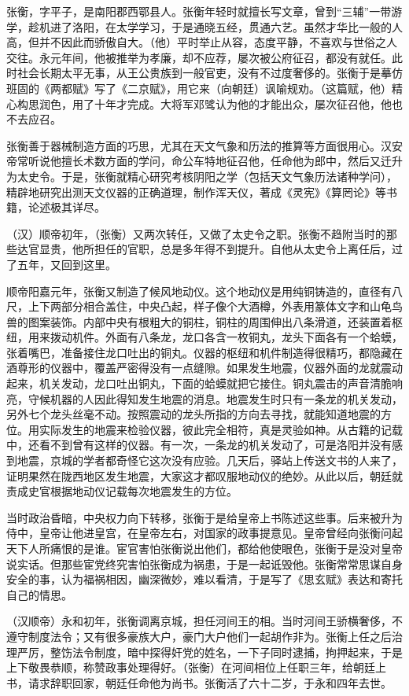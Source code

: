 \documentclass[12pt,UTF-8,openany]{ctexbook}
\begin{document}
\begin{normalsize}
    
    张衡，字平子，是南阳郡西鄂县人。张衡年轻时就擅长写文章，曾到“三辅”一带游学，趁机进了洛阳，在太学学习，于是通晓五经，贯通六艺。虽然才华比一般的人高，但并不因此而骄傲自大。（他）平时举止从容，态度平静，不喜欢与世俗之人交往。永元年间，他被推举为孝廉，却不应荐，屡次被公府征召，都没有就任。此时社会长期太平无事，从王公贵族到一般官吏，没有不过度奢侈的。张衡于是摹仿班固的《两都赋》写了《二京赋》，用它来（向朝廷）讽喻规劝。（这篇赋，他）精心构思润色，用了十年才完成。大将军邓骘认为他的才能出众，屡次征召他，他也不去应召。
    
    张衡善于器械制造方面的巧思，尤其在天文气象和历法的推算等方面很用心。汉安帝常听说他擅长术数方面的学问，命公车特地征召他，任命他为郎中，然后又迁升为太史令。于是，张衡就精心研究考核阴阳之学（包括天文气象历法诸种学问），精辟地研究出测天文仪器的正确道理，制作浑天仪，著成《灵宪》《算罔论》等书籍，论述极其详尽。
    
    （汉）顺帝初年，（张衡）又两次转任，又做了太史令之职。张衡不趋附当时的那些达官显贵，他所担任的官职，总是多年得不到提升。自他从太史令上离任后，过了五年，又回到这里。
    
    顺帝阳嘉元年，张衡又制造了候风地动仪。这个地动仪是用纯铜铸造的，直径有八尺，上下两部分相合盖住，中央凸起，样子像个大酒樽，外表用篆体文字和山龟鸟兽的图案装饰。内部中央有根粗大的铜柱，铜柱的周围伸出八条滑道，还装置着枢纽，用来拨动机件。外面有八条龙，龙口各含一枚铜丸，龙头下面各有一个蛤蟆，张着嘴巴，准备接住龙口吐出的铜丸。仪器的枢纽和机件制造得很精巧，都隐藏在酒尊形的仪器中，覆盖严密得没有一点缝隙。如果发生地震，仪器外面的龙就震动起来，机关发动，龙口吐出铜丸，下面的蛤蟆就把它接住。铜丸震击的声音清脆响亮，守候机器的人因此得知发生地震的消息。地震发生时只有一条龙的机关发动，另外七个龙头丝毫不动。按照震动的龙头所指的方向去寻找，就能知道地震的方位。用实际发生的地震来检验仪器，彼此完全相符，真是灵验如神。从古籍的记载中，还看不到曾有这样的仪器。有一次，一条龙的机关发动了，可是洛阳并没有感到地震，京城的学者都奇怪它这次没有应验。几天后，驿站上传送文书的人来了，证明果然在陇西地区发生地震，大家这才都叹服地动仪的绝妙。从此以后，朝廷就责成史官根据地动仪记载每次地震发生的方位。
    
    当时政治昏暗，中央权力向下转移，张衡于是给皇帝上书陈述这些事。后来被升为侍中，皇帝让他进皇宫，在皇帝左右，对国家的政事提意见。皇帝曾经向张衡问起天下人所痛恨的是谁。宦官害怕张衡说出他们，都给他使眼色，张衡于是没对皇帝说实话。但那些宦党终究害怕张衡成为祸患，于是一起诋毁他。张衡常常思谋自身安全的事，认为福祸相因，幽深微妙，难以看清，于是写了《思玄赋》表达和寄托自己的情思。
    
    （汉顺帝）永和初年，张衡调离京城，担任河间王的相。当时河间王骄横奢侈，不遵守制度法令；又有很多豪族大户，豪门大户他们一起胡作非为。张衡上任之后治理严厉，整饬法令制度，暗中探得奸党的姓名，一下子同时逮捕，拘押起来，于是上下敬畏恭顺，称赞政事处理得好。（张衡）在河间相位上任职三年，给朝廷上书，请求辞职回家，朝廷任命他为尚书。张衡活了六十二岁，于永和四年去世。
    
\end{normalsize}
\end{document}
